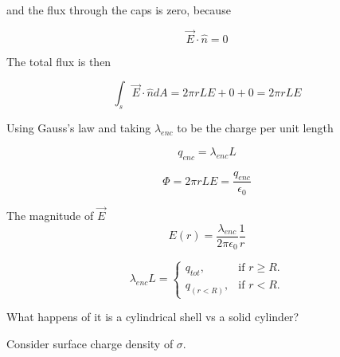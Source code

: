 \documentclass[14pt]{memoir}
\begin{document}
and the flux through the caps is zero, because

\begin{equation}
\vec{E} \cdot \hat{n} = 0
\end{equation}

The total flux is then 

\begin{equation}
\int_s \vec{E} \cdot \hat{n} dA = 2 \pi r L E + 0 + 0 = 2 \pi r L E
\end{equation}

Using Gauss's law and taking $\lambda_{enc}$ to be the charge per unit length

\begin{equation}
q_{enc} = \lambda_{enc} L
\end{equation}

\begin{equation}
\Phi = 2 \pi r L E = \frac{q_{enc}}{\epsilon_0}
\end{equation}

The magnitude of $\vec{E}$
\begin{equation}
E(r)  = \frac{\lambda_{enc}}{2 \pi \epsilon_0} \frac{1}{r}
\end{equation}

\begin{equation}
  \lambda_{enc} L =\begin{cases}
    q_{tot}, & \text{if } r \geq R.\\
    q_{(r<R)}, & \text{if } r < R.
  \end{cases}
\end{equation}

What happens of it is a cylindrical shell vs a solid cylinder?

Consider surface charge density of $\sigma$.
\end{document}
